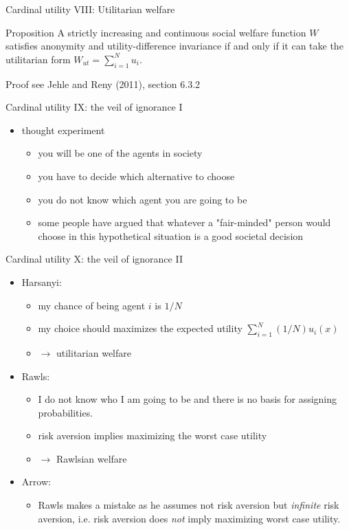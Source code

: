\documentclass[bigger]{beamer}
\begin{document}
\begin{frame}[label={sec:orga279d63}]{Cardinal utility VIII: Utilitarian welfare}
\begin{block}{Proposition}
A strictly increasing and continuous social welfare function \(W\) satisfies anonymity and utility-difference invariance if and only if it can take the utilitarian form \(W_{ut}=\sum_{i=1}^N u_i\).
\end{block}
\begin{block}{Proof}
see Jehle and Reny (2011), section 6.3.2
\end{block}
\end{frame}
\begin{frame}[label={sec:org3445147}]{Cardinal utility IX: the veil of ignorance I}
\begin{itemize}
\item thought experiment  
\begin{itemize}
\item you will be one of the agents in society
\item you have to decide which alternative to choose
\item you do not know which agent you are going to be
\item some people have argued that whatever a "fair-minded" person would choose in this hypothetical situation is a good societal decision
\end{itemize}
\end{itemize}
\end{frame}
\begin{frame}[label={sec:orgb6e5c12}]{Cardinal utility X: the veil of ignorance II}
\begin{itemize}
\item Harsanyi:
\begin{itemize}
\item my chance of being agent \(i\) is \(1/N\)
\item my choice should maximizes the expected utility \(\sum_{i=1}^N (1/N) u_i(x)\)
\item \(\rightarrow\) utilitarian welfare
\end{itemize}
\item Rawls:
\begin{itemize}
\item I do not know who I am going to be and there is no basis for assigning probabilities.
\item risk aversion implies maximizing the worst case utility
\item \(\rightarrow\) Rawlsian welfare
\end{itemize}

\item Arrow:
\begin{itemize}
\item Rawls makes a mistake as he assumes not risk aversion but \emph{infinite} risk aversion, i.e. risk aversion does \emph{not} imply maximizing worst case utility.
\end{itemize}
\end{itemize}
\end{frame}
\end{document}
